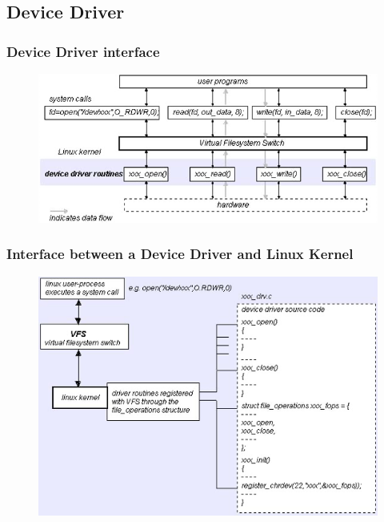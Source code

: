 \subsection{Device Driver} %
\begin{frame}[fragile]
    \frametitle{Device Driver interface}
    \begin{figure}
    \includegraphics[width=0.9\linewidth]{figs/driver-interface.png}
    \end{figure}
\end{frame}
% 
% 
% 
\begin{frame}[fragile]
    \frametitle{Interface between a Device Driver and Linux Kernel}
    \begin{figure}
    \includegraphics[width=0.65\linewidth]{figs/kernel-interface.png}
    \end{figure}
\end{frame}
